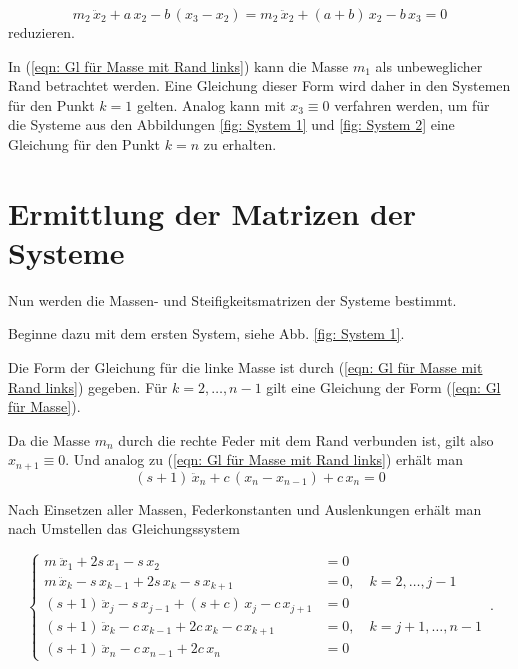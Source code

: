 \documentclass[a4paper,12pt]{report}
\newcommand{\1}{\mathds{1}}
\theoremstyle{plain} %
\theoremstyle{definition} %
\theoremstyle{remark}
\begin{document}
            \begin{equation}
                  \label{eqn: Gl für Masse mit Rand links}
                  m_2\,\ddot x_2 + a\,x_2 - b\,(x_3-x_2) = m_2\,\ddot x_2 + (a+b)\,x_2 -b\,x_3 = 0
            \end{equation}
            reduzieren.

            In (\ref{eqn: Gl für Masse mit Rand links}) kann die Masse $m_1$ als unbeweglicher Rand betrachtet werden.
            Eine Gleichung dieser Form wird daher in den Systemen für den Punkt $k=1$ gelten.
            Analog kann mit $x_3\equiv 0$ verfahren werden, um für die Systeme aus den Abbildungen \ref{fig: System 1} und \ref{fig: System 2}
            eine Gleichung für den Punkt $k=n$ zu erhalten.

      \section{Ermittlung der Matrizen der Systeme}
            Nun werden die Massen- und Steifigkeitsmatrizen der Systeme bestimmt.
           
            Beginne dazu mit dem ersten System, siehe Abb. \ref{fig: System 1}.

            Die Form der Gleichung für die linke Masse ist durch (\ref{eqn: Gl für Masse mit Rand links}) gegeben.
            Für $k=2,\dots, n-1$ gilt eine Gleichung der Form (\ref{eqn: Gl für Masse}).
            
            Da die Masse $m_n$ durch die rechte Feder mit dem Rand verbunden ist, gilt also $x_{n+1} \equiv 0$.
            Und analog zu (\ref{eqn: Gl für Masse mit Rand links}) erhält man
            $$(s+1)\,\ddot x_n + c\,(x_n-x_{n-1}) + c\,x_n = 0$$  

            Nach Einsetzen aller Massen, Federkonstanten und Auslenkungen erhält man nach Umstellen das Gleichungssystem

            $$\begin{cases}
                  m\ \ddot x_1 + 2s\,x_1 - s\,x_2 & = 0   \\
                  m\,\ddot x_k -s\,x_{k-1} + 2s\,x_k -s\,x_{k+1} & = 0,\quad k=2,\dots,j-1\\
                  (s+1)\,\ddot x_j -s\,x_{j-1} + (s+c)\,x_j -c\,x_{j+1} & = 0\\
                  (s+1)\,\ddot x_k -c\,x_{k-1} + 2c\,x_k -c\,x_{k+1} & = 0,\quad k=j+1,\dots,n-1\\
                  (s+1)\,\ddot x_n -c\,x_{n-1}+ 2c\,x_n & = 0
            \end{cases}\,.$$
\end{document}
